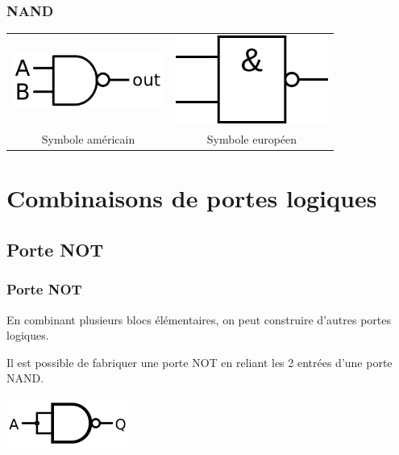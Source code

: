 \documentclass[svgnames,11pt]{beamer}
\begin{document}
\begin{frame}
    \frametitle{NAND}

    \begin{center}
        \begin{tabular}{cc}
            \includegraphics[width=5cm]{ressources/not-and-us.png}
                              &
            \includegraphics[width=5cm]{ressources/not-and-eu.png} \\
            Symbole américain & Symbole européen                   \\
        \end{tabular}
    \end{center}

\end{frame}
\section{Combinaisons de portes logiques}
\subsection{Porte NOT}
\begin{frame}
    \frametitle{Porte NOT}

    \begin{aretenir}[]
        En combinant plusieurs blocs élémentaires, on peut construire d'autres portes logiques.
    \end{aretenir}
    Il est possible de fabriquer une porte NOT en reliant les 2 entrées d’une porte NAND.
    \begin{center}
        \centering
        \includegraphics[width=4cm]{ressources/not-from-nand.png}
        \label{IMG}
    \end{center}
\end{frame}
\end{document}
